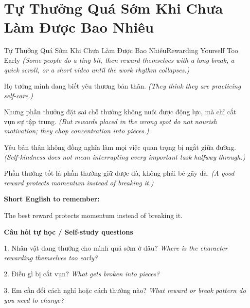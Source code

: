 \section{Tự Thưởng Quá Sớm Khi Chưa Làm Được Bao Nhiêu}
\begin{truyen}{Tự Thưởng Quá Sớm Khi Chưa Làm Được Bao Nhiêu}{Rewarding Yourself Too Early}
\textit{(Some people do a tiny bit, then reward themselves with a long break, a quick scroll, or a short video until the work rhythm collapses.)}

Họ tưởng mình đang biết yêu thương bản thân.
\textit{(They think they are practicing self-care.)}

Nhưng phần thưởng đặt sai chỗ thường không nuôi được động lực, mà chỉ cắt vụn sự tập trung.
\textit{(But rewards placed in the wrong spot do not nourish motivation; they chop concentration into pieces.)}

Yêu bản thân không đồng nghĩa làm mọi việc quan trọng bị ngắt giữa đường.
\textit{(Self-kindness does not mean interrupting every important task halfway through.)}

\end{truyen}

\begin{baihoc}
Phần thưởng tốt là phần thưởng giữ được đà, không phải bẻ gãy đà.
\textit{(A good reward protects momentum instead of breaking it.)}
\end{baihoc}

\begin{ghinhoanh}
\textbf{Short English to remember:}

The best reward protects momentum instead of breaking it.

\end{ghinhoanh}

\begin{tuhocnhanh}
\textbf{Câu hỏi tự học / Self-study questions}

1. Nhân vật đang thưởng cho mình quá sớm ở đâu? \textit{Where is the character rewarding themselves too early?}

2. Điều gì bị cắt vụn? \textit{What gets broken into pieces?}

3. Em cần đổi cách nghỉ hoặc cách thưởng nào? \textit{What reward or break pattern do you need to change?}
\end{tuhocnhanh}
\ngancach

